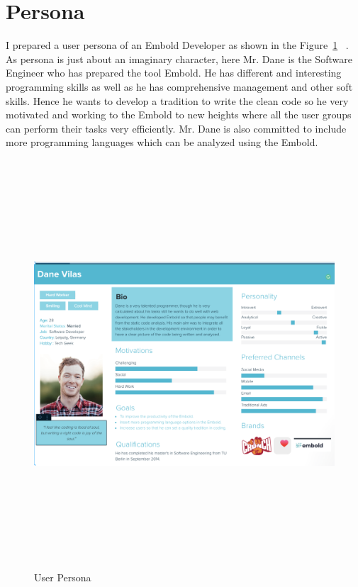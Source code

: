 \section{Persona}
I prepared a user persona of an Embold Developer as shown in the Figure~\ref{fig:User Persona} ~\cite{persona}. As persona is just about an imaginary character, here Mr. Dane is the Software Engineer who has prepared the tool Embold. He has different and interesting programming skills as well as he has  comprehensive management and other soft skills. Hence he wants to develop a tradition to write the clean code so he very motivated and working to the Embold to new heights where all the user groups can perform their tasks very efficiently. Mr. Dane is also committed to   include more programming languages which can be analyzed using the Embold.
\begin{figure}[htbp]
\begin{center}
\includegraphics[width=6.5in, height=6in]{persona.png}
\caption{User Persona}
\label{fig:User Persona}
\end{center}
\end{figure}